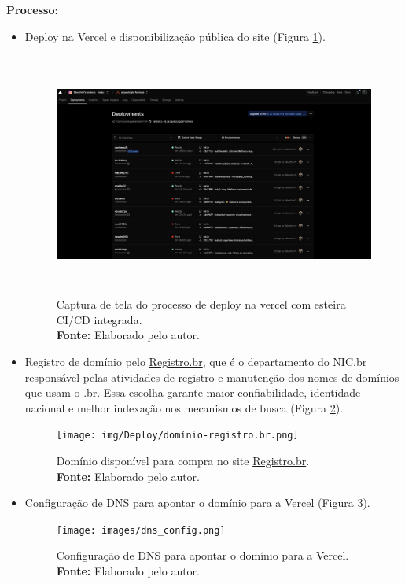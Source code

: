 \textbf{Processo}:
\begin{itemize}
    \item Deploy na Vercel e disponibilização pública do site (Figura \ref{fig:deploy_vercel}). 
\begin{figure}[H]
    \centering
    \includegraphics[height=8cm, keepaspectratio]{img/Deploy/deploy_vercel.png}
    \caption{ Captura de tela do processo de deploy na vercel com esteira CI/CD integrada. \\
        \textbf{Fonte:} Elaborado pelo autor.}
    \label{fig:deploy_vercel}
\end{figure}

    \item Registro de domínio pelo \href{www.registro.br}{Registro.br}, que é o departamento do NIC.br responsável pelas atividades de registro e manutenção dos nomes de domínios que usam o .br. Essa escolha garante maior confiabilidade, identidade nacional e melhor indexação nos mecanismos de busca (Figura \ref{fig:dominio_registro_br}).
\begin{figure}[H]
    \centering
    \texttt{[image: img/Deploy/domínio-registro.br.png]}
    \caption{ Domínio disponível para compra no site \href{www.registro.br}{Registro.br}. \\
        \textbf{Fonte:} Elaborado pelo autor.}
    \label{fig:dominio_registro_br}
\end{figure}

    \item Configuração de DNS para apontar o domínio para a Vercel (Figura \ref{fig:dns}).
\begin{figure}[H]
    \centering
    \texttt{[image: images/dns\_config.png]}
    \caption{ Configuração de DNS para apontar o domínio para a Vercel. \\
        \textbf{Fonte:} Elaborado pelo autor.}
    \label{fig:dns}
\end{figure}

\end{itemize}



